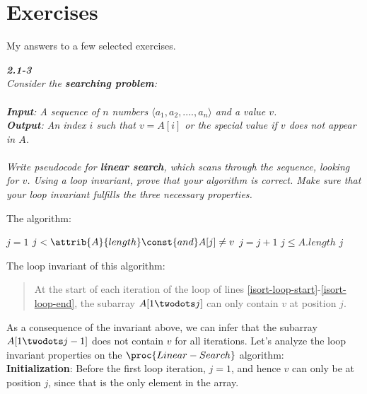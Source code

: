 \documentclass[8pt,a4paper]{article}
\begin{document}
\section*{Exercises}
My answers to a few selected exercises.

\begin{framed}
\textbf{\textit{2.1-3}} \\
\textit{Consider the \textbf{searching problem}: \\
\\
\textbf{Input}: A sequence of $n$ numbers $\langle a_1, a_2, ...., a_n \rangle$ and a value $v$. \\
\textbf{Output}: An index $i$ such that $v = A[i]$ or the special value  if $v$
does not appear in $A$. \\
\\
Write pseudocode for \textbf{linear search}, which scans through the sequence, looking
for $v$. Using a loop invariant, prove that your algorithm is correct. Make sure
that your loop invariant fulfills the three necessary properties.}
\end{framed}

The algorithm:

\begin{codebox}
  \li $j = 1$
  \li \While $j < \attrib{A}{length} \const{and} A[j] \neq v$     \label{isort-loop-start}
        \Do
  \li     $j = j + 1$
  \End                                                            \label{isort-loop-end}
  \li \If $j \leq A.length$
        \Then
  \li     \Return $j$
  \li   \Else
  \li     \Return {}
        \End
\end{codebox}

The loop invariant of this algorithm:

\begin{quotation}
  At the start of each iteration of the \While loop of lines \ref{isort-loop-start}-\ref{isort-loop-end},
  the subarray $A[1 \twodots j]$ can only contain $v$ at position $j$.
\end{quotation}

As a consequence of the invariant above, we can infer that the subarray $A[1 \twodots j-1]$
does not contain $v$ for all iterations. Let's analyze the loop invariant properties
on the $\proc{Linear-Search}$ algorithm: \\

\textbf{Initialization}: Before the first loop iteration, $j = 1$, and hence $v$ can only
be at position $j$, since that is the only element in the array. \\
\end{document}
